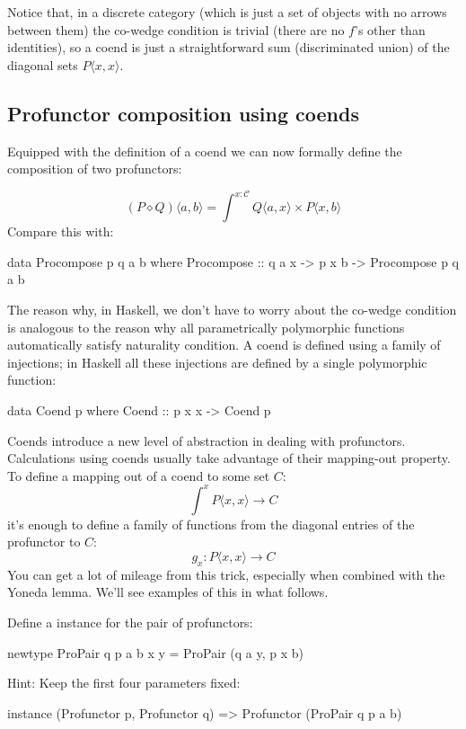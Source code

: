 \documentclass[DaoFP]{subfiles}
\begin{document}
Notice that, in a discrete category (which is just a set of objects with no arrows between them) the co-wedge condition is trivial (there are no $f$'s other than identities), so a coend is just a straightforward sum (discriminated union) of the diagonal sets $P \langle x, x \rangle$.

\subsection{Profunctor composition using coends}

Equipped with the definition of a coend we can now formally define the composition of two profunctors:

\[ (P \diamond Q)\langle a, b \rangle = \int^{x\colon \mathcal{C}} Q \langle a, x \rangle \times P \langle x, b \rangle\]
Compare this with:
\begin{haskell}
data Procompose p q a b where
  Procompose ::  q a x -> p x b -> Procompose p q a b
\end{haskell}

The reason why, in Haskell, we don't have to worry about the co-wedge condition is analogous to the reason why all parametrically polymorphic functions automatically satisfy naturality condition. A coend is defined using a family of injections; in Haskell all these injections are defined by a single polymorphic function:
\begin{haskell}
data Coend p where
  Coend ::  p x x -> Coend p
\end{haskell}

Coends introduce a new level of abstraction in dealing with profunctors. Calculations using coends usually take advantage of their mapping-out property. To define a mapping out of a coend to some set $C$:
\[ \int^x P \langle x, x \rangle \to C \]
 it's enough to define a family of functions from the diagonal entries of the profunctor to $C$:
 \[ g_x \colon P \langle x, x \rangle \to C \]
 You can get a lot of mileage from this trick, especially when combined with the Yoneda lemma. We'll see examples of this in what follows.

\begin{exercise}
Define a  instance for the pair of profunctors:
\begin{haskell}
newtype ProPair q p a b x y = ProPair (q a y, p x b)
\end{haskell}
Hint: Keep the first four parameters fixed:
\begin{haskell}
instance (Profunctor p, Profunctor q) => Profunctor (ProPair q p a b)
\end{haskell}
\end{exercise}
\end{document}
